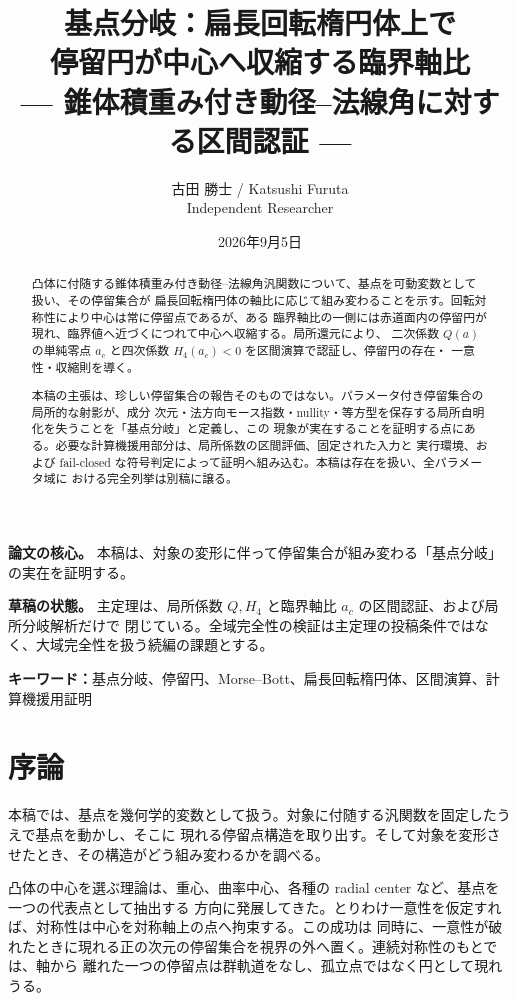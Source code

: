 \documentclass[a4paper,11pt]{ltjsarticle}
\title{基点分岐：扁長回転楕円体上で\\
停留円が中心へ収縮する臨界軸比\\[2mm]
\large — 錐体積重み付き動径–法線角に対する区間認証 —}
\author{古田 勝士 / Katsushi Furuta\\ Independent Researcher}
\date{2026年9月5日}
\theoremstyle{plain}
\theoremstyle{definition}
\newcommand{\leadin}[1]{\medskip\noindent\textbf{#1}\quad\ignorespaces}
\begin{document}
\maketitle

\leadin{論文の核心。}
本稿は、対象の変形に伴って停留集合が組み変わる「基点分岐」の実在を証明する。

\leadin{草稿の状態。}
主定理は、局所係数 \(Q, H_4\) と臨界軸比 \(a_c\) の区間認証、および局所分岐解析だけで
閉じている。全域完全性の検証は主定理の投稿条件ではなく、大域完全性を扱う続編の課題とする。

\begin{abstract}
凸体に付随する錐体積重み付き動径–法線角汎関数について、基点を可動変数として扱い、その停留集合が
扁長回転楕円体の軸比に応じて組み変わることを示す。回転対称性により中心は常に停留点であるが、ある
臨界軸比の一側には赤道面内の停留円が現れ、臨界値へ近づくにつれて中心へ収縮する。局所還元により、
二次係数 \(Q(a)\) の単純零点 \(a_c\) と四次係数 \(H_4(a_c)<0\) を区間演算で認証し、停留円の存在・
一意性・収縮則を導く。

本稿の主張は、珍しい停留集合の報告そのものではない。パラメータ付き停留集合の局所的な射影が、成分
次元・法方向モース指数・nullity・等方型を保存する局所自明化を失うことを「基点分岐」と定義し、この
現象が実在することを証明する点にある。必要な計算機援用部分は、局所係数の区間評価、固定された入力と
実行環境、および fail-closed な符号判定によって証明へ組み込む。本稿は存在を扱い、全パラメータ域に
おける完全列挙は別稿に譲る。
\end{abstract}

\noindent\textbf{キーワード：}基点分岐、停留円、Morse–Bott、扁長回転楕円体、区間演算、計算機援用証明

\section{序論}

本稿では、基点を幾何学的変数として扱う。対象に付随する汎関数を固定したうえで基点を動かし、そこに
現れる停留点構造を取り出す。そして対象を変形させたとき、その構造がどう組み変わるかを調べる。

凸体の中心を選ぶ理論は、重心、曲率中心、各種の radial center など、基点を一つの代表点として抽出する
方向に発展してきた。とりわけ一意性を仮定すれば、対称性は中心を対称軸上の点へ拘束する。この成功は
同時に、一意性が破れたときに現れる正の次元の停留集合を視界の外へ置く。連続対称性のもとでは、軸から
離れた一つの停留点は群軌道をなし、孤立点ではなく円として現れうる。
\end{document}
